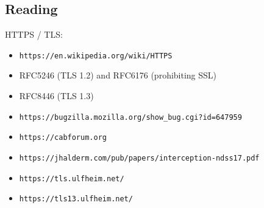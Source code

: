 \documentclass[xga]{xdvislides}
\begin{document}
\subsection{Reading}
HTTPS / TLS:
\begin{itemize}
	\item \verb+https://en.wikipedia.org/wiki/HTTPS+
	\item RFC5246 (TLS 1.2) and RFC6176 (prohibiting SSL)
	\item RFC8446 (TLS 1.3)
	\item \verb+https://bugzilla.mozilla.org/show_bug.cgi?id=647959+
	\item \verb+https://cabforum.org+
	\item \verb+https://jhalderm.com/pub/papers/interception-ndss17.pdf+
	\item \verb+https://tls.ulfheim.net/+
	\item \verb+https://tls13.ulfheim.net/+
\end{itemize}

\end{document}
